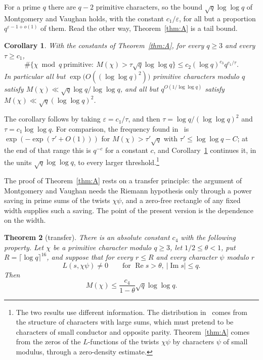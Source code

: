 \documentclass[11pt,a4paper,reqno]{amsart}
\newtheorem{theorem}{Theorem}[section]
\newtheorem{corollary}[theorem]{Corollary}
\theoremstyle{remark}
\numberwithin{equation}{section}
\renewcommand{\Re}{\operatorname{Re}}
\renewcommand{\Im}{\operatorname{Im}}
\newcommand{\eps}{\varepsilon}
\begin{document}
For a prime $q$ there are $q-2$ primitive characters, so the bound $\sqrt q\log\log q$ of Montgomery and Vaughan holds, with the constant $c_1/\eps$, for all but a proportion $q^{\eps-1+o(1)}$ of them. Read the other way, Theorem~\ref{thm:A} is a tail bound.

\begin{corollary}\label{cor:tail}
With the constants of Theorem~\ref{thm:A}, for every $q\ge3$ and every $\tau\ge c_1$,
\[
  \#\bigl\{\chi\bmod q\ \text{primitive}:\ M(\chi)>\tau\sqrt q\log\log q\bigr\}\le c_2(\log q)^{c_3}q^{c_1/\tau}.
\]
In particular all but $\exp\bigl(O((\log\log q)^2)\bigr)$ primitive characters modulo $q$ satisfy $M(\chi)\ll\sqrt q\log q/\log\log q$, and all but $q^{O(1/\log\log q)}$ satisfy $M(\chi)\ll\sqrt q(\log\log q)^2$.
\end{corollary}

The corollary follows by taking $\eps=c_1/\tau$, and then $\tau=\log q/(\log\log q)^2$ and $\tau=c_1\log\log q$. For comparison, the frequency found in~\cite{BGGK18} is $\exp(-\exp(\tau'+O(1)))$ for $M(\chi)>\tau'\sqrt q$ with $\tau'\le\log\log q-C$; at the end of that range this is $q^{-c}$ for a constant $c$, and Corollary~\ref{cor:tail} continues it, in the units $\sqrt q\log\log q$, to every larger threshold.\footnote{The two results use different information. The distribution in~\cite{BGGK18} comes from the structure of characters with large sums, which must pretend to be characters of small conductor and opposite parity. Theorem~\ref{thm:A} comes from the zeros of the $L$-functions of the twists $\chi\psi$ by characters $\psi$ of small modulus, through a zero-density estimate.}

The proof of Theorem~\ref{thm:A} rests on a transfer principle: the argument of Montgomery and Vaughan needs the Riemann hypothesis only through a power saving in prime sums of the twists $\chi\psi$, and a zero-free rectangle of any fixed width supplies such a saving. The point of the present version is the dependence on the width.

\begin{theorem}[transfer]\label{thm:B}
There is an absolute constant $c_4$ with the following property. Let $\chi$ be a primitive character modulo $q\ge3$, let $1/2\le\theta<1$, put $R=\lceil\log q\rceil^{16}$, and suppose that for every $r\le R$ and every character $\psi$ modulo $r$
\begin{equation}\label{eq:H}
  L(s,\chi\psi)\ne0\qquad\text{for }\Re s>\theta,\ |\Im s|\le q.
\end{equation}
Then
\[
  M(\chi)\le\frac{c_4}{1-\theta}\sqrt q\log\log q.
\]
\end{theorem}
\end{document}
